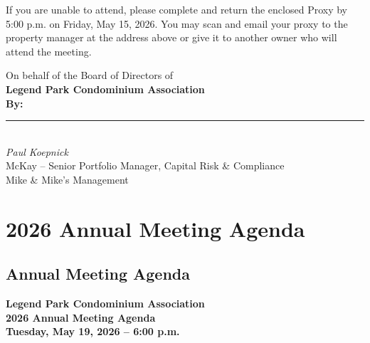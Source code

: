 \documentclass[11pt]{article}
\begin{document}
If you are unable to attend, please complete and return the enclosed Proxy by 5{:}00 p.m.
on Friday, May 15, 2026. You may scan and email your proxy to the property manager at the
address above or give it to another owner who will attend the meeting.

\vspace{1.5em}

\noindent
On behalf of the Board of Directors of\\
\textbf{Legend Park Condominium Association}\\[1em]
\textbf{By:} \rule{2.5in}{0.4pt}\\[-0.2em]
\emph{Paul Koepnick}\\
McKay -- Senior Portfolio Manager, Capital Risk \& Compliance\\
Mike \& Mike's Management

\newpage

\section{2026 Annual Meeting Agenda}

\subsection*{Annual Meeting Agenda}
\vspace{-0.6em}

\noindent
\textbf{Legend Park Condominium Association}\\
\textbf{2026 Annual Meeting Agenda}\\
\textbf{Tuesday, May 19, 2026 -- 6{:}00 p.m.}

\vspace{0.5em}
\end{document}
